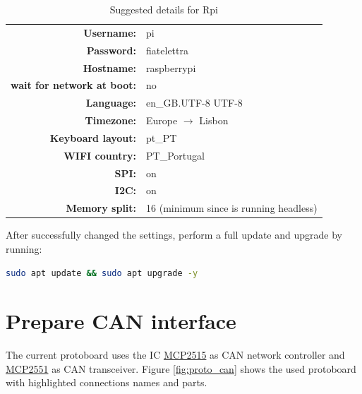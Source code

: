 \begin{table}[h]
	\centering
	\begin{tabular}{rl}
		\toprule
		\textbf{Username:}& pi\\
		\textbf{Password:}& fiatelettra\\
		\textbf{Hostname:}& raspberrypi\\
		\textbf{wait for network at boot:}& no\\
		\textbf{Language:}& en\_GB.UTF-8 UTF-8\\
	    \textbf{Timezone:}& Europe $\rightarrow$ Lisbon\\
	    \textbf{Keyboard layout:}& pt\_PT\\
	    \textbf{WIFI country:}& PT\_Portugal\\
	    \textbf{SPI:}& on\\	
		\textbf{I2C:}& on\\
		\textbf{Memory split:}& 16 (minimum since is running headless)\\
		\bottomrule
	\end{tabular}
	\caption{Suggested details for \gls{Rpi}}
	\label{tab:suggested_config}
\end{table}

After successfully changed the settings, perform a full update and upgrade by running:
\begin{lstlisting}[frame=none,language=bash,backgroundcolor=\color{gray!15},numbers=none]
sudo apt update && sudo apt upgrade -y
\end{lstlisting}


\section{Prepare CAN interface}
\label{section:can}
The current protoboard uses the \gls{IC} \href{https://www.microchip.com/wwwproducts/en/MCP2515}{MCP2515} as \gls{CAN} network controller and \href{https://www.microchip.com/wwwproducts/en/MCP2551}{MCP2551} as \gls{CAN} transceiver. Figure \ref{fig:proto_can} shows the used protoboard with highlighted connections names and parts.

